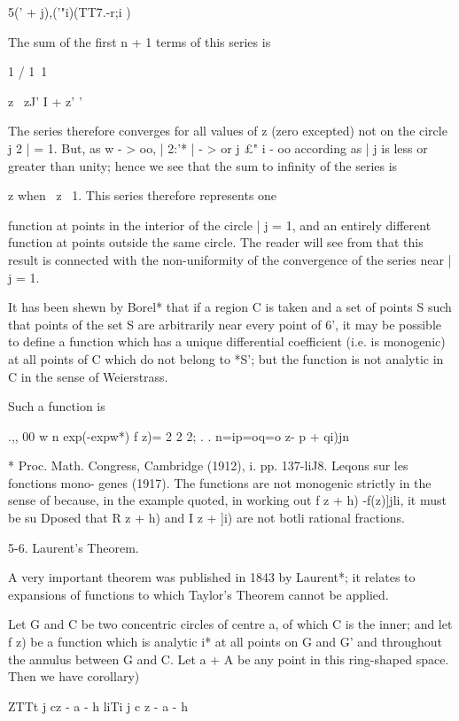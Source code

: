 {{5(' + j)\!,('"i)(TT7.-r;i )

The sum of the first n + 1 terms of this series is

1 / 1\ 1

z \ zJ' I + z' '

The series therefore converges for all values of z (zero excepted) not
on the circle j 2 | = 1. But, as w - > oo, | 2:'* | - > or j £" i -
oo according as | j is less or greater than unity; hence we see that
the sum to infinity of the series is

z when \ z\ < 1, and - when | j > 1. This series therefore represents
one

function at points in the interior of the circle | j = 1, and an
entirely different function at points outside the same circle. The
reader will see from that this result is connected with the
non-uniformity of the convergence of the series near | j = 1.

It has been shewn by Borel* that if a region C is taken and a set of
points S such that points of the set S are arbitrarily near every
point of 6', it may be possible to define a function which has a
unique differential coefficient (i.e. is monogenic) at all points of C
which do not belong to *S'; but the function is not analytic in C in
the sense of Weierstrass.

Such a function is

.,, 00 w n exp(-expw*) f z)= 2 2 2; . . n=ip=oq=o z- p + qi)jn

* Proc. Math. Congress, Cambridge (1912), i. pp. 137-liJ8. Leqons sur
les fonctions mono- genes (1917). The functions are not monogenic
strictly in the sense of because, in the example quoted, in
working out f z + h) -f(z)]jli, it must be su Dposed that R z + h) and
I z + ]i) are not botli rational fractions.

%
%

5-6. Laurent's Theorem.

A very important theorem was published in 1843 by Laurent*; it
relates to expansions of functions to which Taylor's Theorem cannot be
applied.

Let G and C be two concentric circles of centre a, of which C is the
inner; and let f z) be a function which is analytic i* at all points
on G and G' and throughout the annulus between G and C. Let a + A be
any point in this ring-shaped space. Then we have  corollary)

 ZTTt j cz - a - h liTi j c z - a - h

}}
